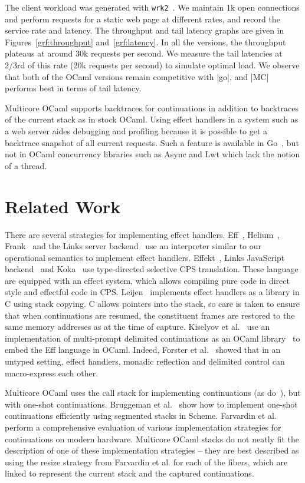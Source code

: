 \documentclass[sigplan,screen]{acmart}
\begin{document}
The client workload was generated with \texttt{wrk2}~\cite{wrk2}. We maintain
1k open connections and perform requests for a static web page at different
rates, and record the service rate and latency. The throughput and tail latency
graphs are given in Figures~\ref{grf:throughput} and~\ref{grf:latency}. In all
the versions, the throughput plateaus at around 30k requests per second. We
measure the tail latencies at 2/3rd of this rate (20k requests per second) to
simulate optimal load. We observe that both of the OCaml versions remain
competitive with |go|, and |MC| performs best in terms of tail latency.

Multicore OCaml supports backtraces for continuations in addition to backtraces
of the current stack as in stock OCaml. Using effect handlers in a system such
as a web server aides debugging and profiling because it is possible to get a
backtrace snapshot of all current requests. Such a feature is available in
Go~\cite{gopprof}, but not in OCaml concurrency libraries such as Async and
Lwt which lack the notion of a thread.

\section{Related Work}
\label{sec:related}

There are several strategies for implementing effect handlers. Eff~\cite{Eff},
Helium~\cite{Biernacki20}, Frank~\cite{Frank} and the Links server
backend~\cite{Hillerstrom20} use an interpreter similar to our operational
semantics to implement effect handlers. Effekt~\cite{Effekt}, Links JavaScript
backend~\cite{Hillerstrom20} and Koka~\cite{Leijen17} use type-directed
selective CPS translation. These language are equipped with an effect system,
which allows compiling pure code in direct style and effectful code in CPS.
Leijen~\cite{Leijen14} implements effect handlers as a library in C using stack
copying. C allows pointers into the stack, so care is taken to ensure that
when continuations are resumed, the constituent frames are restored to the same
memory addresses as at the time of capture. Kiselyov et al.~\cite{Kiselyov18}
use an implementation of multi-prompt delimited continuations as an OCaml
library~\cite{Kiselyov12} to embed the Eff language in OCaml. Indeed, Forster et
al.~\cite{Forster19} showed that in an untyped setting, effect handlers,
monadic reflection and delimited control can macro-express each other.

Multicore OCaml uses the call stack for implementing continuations (as
do~\cite{Leijen14, Kiselyov12}), but with one-shot continuations. Bruggeman et
al.~\cite{Bruggeman96} show how to implement one-shot continuations efficiently
using segmented stacks in Scheme. Farvardin et al.~\cite{Farvardin20} perform a
comprehensive evaluation of various implementation strategies for continuations
on modern hardware. Multicore OCaml stacks do not neatly fit the description of
one of these implementation strategies -- they are best described as using the
resize strategy from Farvardin et al. for each of the fibers, which are
linked to represent the current stack and the captured continuations.
\end{document}

